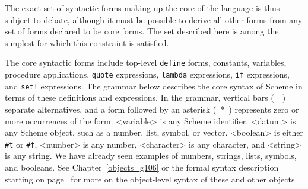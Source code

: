 The exact set of syntactic forms making up the core of the language
is thus subject to debate, although it must be possible to derive
all other forms from any set of forms declared to be core forms.
The set described here is among the simplest for which this constraint
is satisfied.


The core syntactic forms include top-level \texttt{define} forms,
constants, variables, procedure applications,
\label{further_s4}\label{further_s5}\texttt{quote} expressions,
\label{further_s6}\texttt{lambda} expressions,
\label{further_s7}\texttt{if} expressions,
and \label{further_s8}\texttt{set!} expressions.
The grammar below describes the core syntax of Scheme in terms
of these definitions and expressions.
In the grammar, vertical bars ( \textbar{} ) separate alternatives, and a form
followed by an asterisk ( * ) represents zero or more occurrences
of the form.
\textless{}variable\textgreater{} is any Scheme identifier.
\textless{}datum\textgreater{} is any Scheme object, such as a number, list, symbol, or
vector.
\textless{}boolean\textgreater{} is either \texttt{\#{}t} or \texttt{\#{}f},
\textless{}number\textgreater{} is any number,
\textless{}character\textgreater{} is any character, and
\textless{}string\textgreater{} is any string.
We have already seen examples of numbers, strings, lists, symbols, and
booleans.
See Chapter \ref{objects_g106} or the formal syntax description starting on
page \pageref{grammar_APPENDIXFORMALSYNTAX}
for more on the object-level syntax of these
and other objects.


  
  
